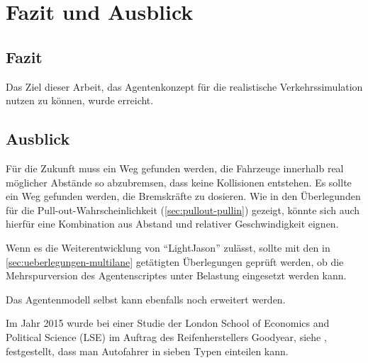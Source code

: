 \section{Fazit und Ausblick}
\label{sec:fazit-ausblick}

\subsection{Fazit}
\label{sec:fazit}

Das Ziel dieser Arbeit, das Agentenkonzept für die realistische Verkehrssimulation nutzen zu können, wurde erreicht.




\subsection{Ausblick}
\label{sec:ausblick}


Für die Zukunft muss ein Weg gefunden werden, die Fahrzeuge innerhalb real möglicher Abstände so abzubremsen, dass keine Kollisionen entstehen. 
Es sollte ein Weg gefunden werden, die Bremskräfte zu dosieren. 
Wie in den Überlegunden für die Pull-out-Wahrscheinlichkeit (\cref{sec:pullout-pullin}) gezeigt, könnte sich auch hierfür eine Kombination aus Abstand und relativer Geschwindigkeit eignen.

Wenn es die Weiterentwicklung von \enquote{LightJason} zulässt, sollte mit den in \cref{sec:ueberlegungen-multilane} getätigten Überlegungen geprüft werden, ob die Mehrspurversion des Agentenscriptes unter Belastung eingesetzt werden kann.


Das Agentenmodell selbst kann ebenfalls noch erweitert werden.

Im Jahr 2015 wurde bei einer Studie der London School of Economics and Political Science (LSE) im Auftrag des Reifenherstellers Goodyear, siehe \cite{fahrertyp}, festgestellt, dass man Autofahrer in sieben Typen einteilen kann.


